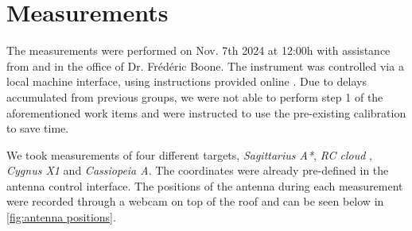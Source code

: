 \section{Measurements}
\label{sec:2}


The measurements were performed on Nov. 7th 2024 at 12:00h with assistance from and in the office of Dr. Frédéric Boone. 
The instrument was controlled via a local machine interface, using instructions provided online \cite{user_instr}. 
Due to delays accumulated from previous groups, we were not able to perform step 1 of the aforementioned work items and were instructed to use the pre-existing calibration to save time.

We took measurements of four different targets, \textit{Sagittarius A*}, \textit{RC cloud }, \textit{Cygnus X1} and \textit{Cassiopeia A}. 
The coordinates were already pre-defined in the antenna control interface.
The positions of the antenna during each measurement were recorded through a webcam on top of the roof and can be seen below in \autoref{fig:antenna positions}. 



